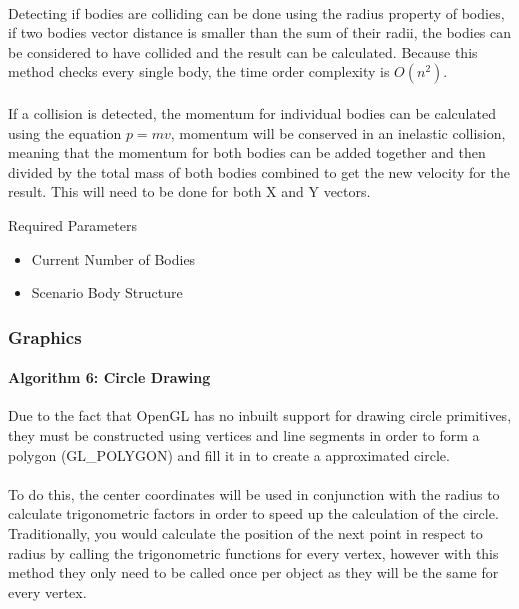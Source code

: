 \paragraph{}
Detecting if bodies are colliding can be done using the radius property of bodies, if two bodies vector distance is smaller than the sum of their radii, the bodies can be considered to have collided and the result can be calculated. Because this method checks every single body, the time order complexity is $O(n^2)$.

\paragraph{}
If a collision is detected, the momentum for individual bodies can be calculated using the equation $p=mv$, momentum will be conserved in an inelastic collision, meaning that the momentum for both bodies can be added together and then divided by the total mass of both bodies combined to get the new velocity for the result. This will need to be done for both X and Y vectors.

Required Parameters
\begin{itemize}
\item Current Number of Bodies
\item Scenario Body Structure
\end{itemize}

\pagebreak
\subsubsection{Graphics}
\paragraph{Algorithm 6: Circle Drawing}
Due to the fact that OpenGL has no inbuilt support for drawing circle primitives, they must be constructed using vertices and line segments in order to form a polygon (GL\_POLYGON) and fill it in to create a approximated circle.

\paragraph{}
To do this, the center coordinates will be used in conjunction with the radius to calculate trigonometric factors in order to speed up the calculation of the circle. Traditionally, you would calculate the position of the next point in respect to radius by calling the trigonometric functions for every vertex, however with this method they only need to be called once per object as they will be the same for every vertex.

